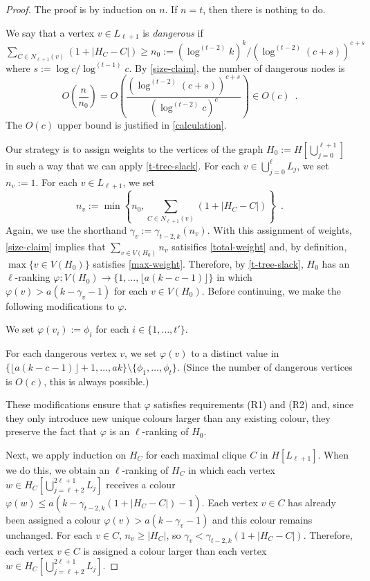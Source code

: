 \documentclass[kpfonts]{patmorin}
\theoremstyle{named}
\begin{document}
\begin{proof}
    The proof is by induction on $n$. If $n=t$, then there is nothing to do.

    We say that a vertex $v\in L_{\ell+1}$ is \emph{dangerous} if $\sum_{C\in N_{\ell+1}(v)}(1+|H_C-C|)\ge n_0:= (\log^{(t-2)} k)^k/(\log^{(t-2)} (c+s))^{c+s}$ where $s:=\log c/\log^{(t-1)} c$.  By \cref{size-claim}, the number of dangerous nodes is
    \[
        O\left(\frac{n}{n_0}\right) = O\left(\frac{(\log^{(t-2)} (c+s))^{c+s}}{(\log^{(t-2)} c)^c}\right) \in O(c) \enspace .
    \]
    The $O(c)$ upper bound is justified in \cref{calculation}.

    Our strategy is to assign weights to the vertices of the graph $H_0:=H[\bigcup_{j=0}^{\ell+1}]$ in such a way that we can apply \cref{t-tree-slack}.  For each $v\in\bigcup_{j=0}^\ell L_j$, we set $n_v:=1$.  For each $v\in L_{\ell+1}$, we set
    \[  n_v := \min\left\{n_0, \sum_{C\in N_{\ell+1}(v)}(1+|H_C-C|) \right\} \enspace .
    \]
    Again, we use the shorthand $\gamma_v := \gamma_{t-2,k}(n_v)$.
    With this assignment of weights, \cref{size-claim} implies that $\sum_{v\in V(H_0)} n_v$ satisifies \cref{total-weight} and, by definition, $\max\{v\in V(H_0)\}$ satisfies \cref{max-weight}.   Therefore, by \cref{t-tree-slack}, $H_{0}$ has an $\ell$-ranking $\varphi:V(H_0)\to\{1,\ldots,\lfloor a(k-c-1)\rfloor\}$ in which $\varphi(v)> a(k-\gamma_v-1)$ for each $v\in V(H_0)$.  Before continuing, we make the following modifications to $\varphi$.

    \begin{compactenum}
        \item We set $\varphi(v_i):=\phi_i$ for each $i\in\{1,\ldots,t'\}$.
        \item For each dangerous vertex $v$, we set $\varphi(v)$ to a distinct value in $\{\lfloor a(k-c-1)\rfloor+1,\ldots,ak\}\setminus\{\phi_1,\ldots,\phi_t\}$. (Since the number of dangerous vertices is $O(c)$, this is always possible.)
    \end{compactenum}
    These modifications ensure that $\varphi$ satisfies requirements (R1) and (R2) and, since they only introduce new unique colours larger than any existing colour, they preserve the fact that $\varphi$ is an $\ell$-ranking of $H_0$.

    Next, we apply induction on $H_C$ for each maximal clique $C$ in $H[L_{\ell+1}]$.  When we do this, we obtain an $\ell$-ranking of $H_C$ in which each vertex $w\in H_C[\bigcup_{j=\ell+2}^{2\ell+1} L_j]$ receives a colour $\varphi(w) \le a(k-\gamma_{t-2,k}(1+|H_C-C|)-1)$.  Each vertex $v\in C$ has already been assigned a colour $\varphi(v)>a(k-\gamma_v-1)$ and this colour remains unchanged.  For each $v\in C$, $n_v\ge |H_C|$, so $\gamma_v < \gamma_{t-2,k}(1+|H_C-C|)$.  Therefore, each vertex $v\in C$ is assigned a colour larger than each vertex $w\in H_C[\bigcup_{j=\ell+2}^{2\ell+1} L_j]$.


\end{proof}
\end{document}
